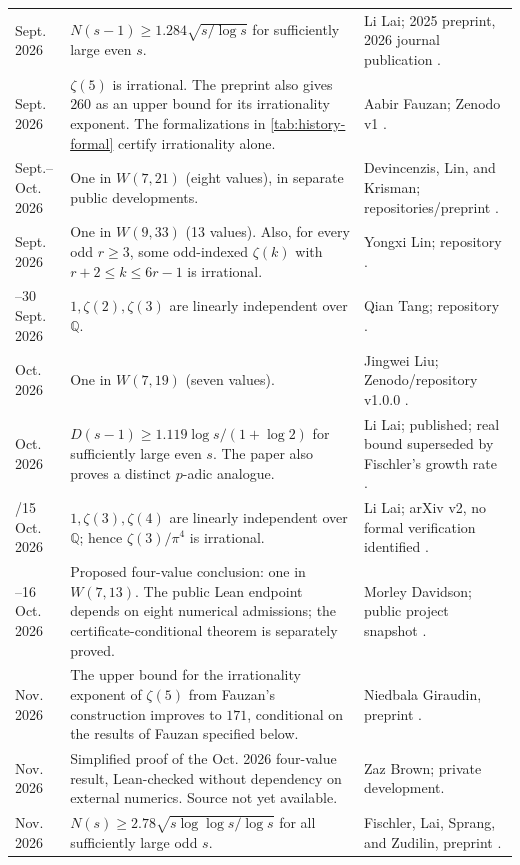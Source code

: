 \documentclass[11pt,letterpaper]{article}
\theoremstyle{definition}
\newcommand{\Q}{\mathbb Q}
\begin{document}
\begin{longtable}{@{}>{\raggedright\arraybackslash}p{}>{\raggedright\arraybackslash}p{}>{\raggedright\arraybackslash}p{}@{}}
16 Sept. 2026 & $N(s-1)\geq1.284\sqrt{s/\log s}$ for sufficiently large
even $s$. & Li Lai; 2025 preprint, 2026 journal publication
\cite{lai2026count}.\\
17 Sept. 2026 & $\zeta(5)$ is irrational. The preprint also gives $260$
as an upper bound for its irrationality exponent. The formalizations in
\cref{tab:history-formal} certify irrationality alone. & Aabir Fauzan;
Zenodo v1 \cite{fauzan2026}.\\
Sept.--Oct. 2026 & One in $W(7,21)$ (eight values), in separate public
developments. & Devincenzis, Lin, and Krisman; repositories/preprint
\cite{devincenzis2026,lin2026,krisman2026}.\\
29 Sept. 2026 & One in $W(9,33)$ (13 values).  Also, for every odd
$r\geq3$, some odd-indexed $\zeta(k)$ with $r+2\leq k\leq6r-1$ is
irrational. & Yongxi Lin; repository \cite{lin2026}.\\
29--30 Sept. 2026 & $1,\zeta(2),\zeta(3)$ are linearly independent over
$\Q$. & Qian Tang; repository \cite{tang2026}.\\
6 Oct. 2026 & One in $W(7,19)$ (seven values). & Jingwei Liu;
Zenodo/repository v1.0.0 \cite{jingweiliu2026}.\\
8 Oct. 2026 & $D(s-1)\geq1.119\log s/(1+\log2)$ for sufficiently large
even $s$.  The paper also proves a distinct $p$-adic analogue. & Li Lai;
published; real bound superseded by Fischler's growth rate
\cite{lai2026small}.\\
5/15 Oct. 2026 & $1,\zeta(3),\zeta(4)$ are linearly independent over
$\Q$; hence $\zeta(3)/\pi^4$ is irrational. & Li Lai;
arXiv v2, no formal verification identified \cite{lai2026linear}.\\
15--16 Oct. 2026 & Proposed four-value conclusion: one in $W(7,13)$.
The public Lean endpoint depends on eight numerical admissions; the
certificate-conditional theorem is separately proved. & Morley Davidson;
public project snapshot \cite{davidson2026}.\\
1 Nov. 2026 & The upper bound for the irrationality exponent of $\zeta(5)$
from Fauzan's construction improves to $171$, conditional on the results
of Fauzan specified below. & Niedbala Giraudin, preprint
\cite[Thm.~1]{niedbalagiraudin2026}.\\
Nov. 2026 & Simplified proof of the Oct. 2026 four-value result, Lean-checked without dependency on external numerics. Source not yet available. & Zaz Brown; private development.\\
12 Nov. 2026 & $N(s)\geq 2.78\sqrt{s\log\log s/\log s}$ for all
sufficiently large odd $s$. & Fischler, Lai, Sprang, and Zudilin,
preprint \cite[Thm.~1.1]{flsz2026}.\\
\end{longtable}
\endgroup
\end{document}
